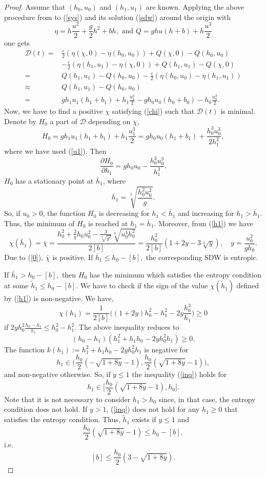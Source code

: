 \documentclass{article}
\theoremstyle{plain}
\theoremstyle{definition}
\theoremstyle{remark}
\begin{document}
\begin{proof}
Assume that $(h_{0},u_{0})$ and $(h_{1},u_{1})$ are known.
Applying the above procedure from \cite{NR2022} 
to (\ref{sys}) and its solution (\ref{sdw})
around the origin with
\[ 
\eta=h\frac{u^{2}}{2}+\frac{g}{2}h^{2}+bh, \text{ and } 
Q=ghu(h+b)+h\frac{u^{3}}{2}
\]
one gets
\[
\begin{split}
\mathcal{D}(t) = & \frac{\varepsilon}{2}\left(\eta(\chi,0) 
- \eta(h_{0},u_{0})\right)+Q(\chi,0)-Q(h_{0},u_{0}) \\
& - \frac{\varepsilon}{2}\left( \eta(h_{1},u_{1}) 
-\eta(\chi,0) \right) +Q(h_{1},u_{1})-Q(\chi,0) \\
= & Q(h_{1},u_{1}) - Q(h_{0},u_{0}) 
-\frac{\varepsilon}{2}\left(\eta(h_{0},u_{0}) 
-\eta(h_{1},u_{1})\right) \\
\approx & Q(h_{1},u_{1}) - Q(h_{0},u_{0}) \\
= & gh_{1}u_{1}(h_{1}+b_{1})+h_{1}\frac{u_{1}^{3}}{2}
- gh_{0}u_{0}(h_{0}+b_{0}) - h_{0}\frac{u_{0}^{3}}{2}. 
\end{split}
\]
Now, we have to find a positive $\chi$ satisfying (\ref{chi}) such that 
$\mathcal{D}(t)$ is minimal. Denote by $H_{0}$ a part of $\mathcal{D}$
depending on $\chi$,
\[
H_{0}=gh_{1}u_{1}(h_{1}+b_{1})+h_{1}\frac{u_{1}^{3}}{2}
=gh_{0}u_{0}(h_{1}+b_{1})+\frac{h_{0}^{3}u_{0}^{3}}{2h_{1}^{2}},
\] 
where we have used (\ref{u1}). Then 
\[\frac{\partial H_0}{\partial h_1}=gh_{0}u_{0}
-\frac{h_{0}^{3}u_{0}^{3}}{h_{1}^{3}}.\]
$H_0$ has a stationary point at $\bar{h}_1$, where
\[
\overline{h}_{1}=\sqrt[3]{\frac{h_{0}^{2}u_{0}^{2}}{g}}.
\]
So, if $u_0>0$, the function $H_0$ is decreasing for
$h_1<\bar{h}_1$ and increasing for $h_1>\bar{h}_1$.
Thus, the minimum of $H_0$ is reached at $h_1=\bar{h}_1$. 
Moreover, from (\ref{h1}) we have
\[\chi(\bar{h}_1)=\bar{\chi}=\frac{h_0^2+\frac{2}{g}h_0u_0^2
-\frac{3}{\sqrt[3]{g^2}}\sqrt[3]{u_0^4h_0^2}}{2[b]}
=\frac{h_0^2}{2[b]}(1+2y-3\sqrt[3]{y}), \quad y=\frac{u_0^2}{gh_0}.\]
Due to (\ref{0}), $\bar{\chi}$ is positive. If $\bar{h}_1\leq h_0-[b],$
 the corresponding SDW is entropic. 

If $\bar{h}_1>h_0-[b],$ then $H_0$ has the minimum which satisfies 
the entropy condition at some $\tilde{h}_1\leq h_0-[b]$. 
We have to check if the sign of the value $\chi(\tilde{h}_1)$ 
defined by (\ref{h1}) is non-negative. We have,
\[\chi(h_1)=\frac{1}{2[b]}\Big((1+2y)h_0^2-h_1^2-2y\frac{h_0^3}{h_1}\Big)\geq 0\]
if $2yh_0^2\frac{h_0-h_1}{h_1}\leq h_0^2-h_1^2$.
The above inequality reduces to
\begin{equation}\label{inq}
(h_0-h_1)(h_1^2+h_1h_0-2yh_0^2h_1)\geq 0.
\end{equation}
The function $k(h_1):=h_1^2+h_1h_0-2yh_0^2h_1$ is negative for 
\[h_1\in\big(\frac{h_0}{2}(-\sqrt{1+8y}-1),\frac{h_0}{2}(\sqrt{1+8y}-1)\big),\]
and non-negative otherwise. So, if $y\leq1$ the inequality (\ref{inq}) holds for 
\[h_1\in\big[\frac{h_0}{2}(\sqrt{1+8y}-1), h_0\big].\]
Note that it is not necessary to consider $h_1>h_0$ since, in that case, 
the entropy condition does not hold.
If $y>1$, (\ref{inq}) does not hold for any $h_1\geq 0$ that satisfies the entropy condition.
Thus,  $\tilde{h}_1$ exists if $y\leq 1$ and 
\[\frac{h_0}{2}(\sqrt{1+8y}-1)\leq h_0-[b],\]
i.e.\
\[[b]\leq \frac{h_0}{2}(3-\sqrt{1+8y}).\]   


\end{proof}
\end{document}
